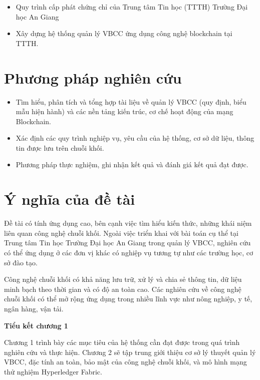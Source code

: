 \begin{itemize}
\item Quy trình cấp phát chứng chỉ của Trung tâm Tin học (TTTH) Trường Đại học An Giang
\item Xây dựng hệ thống quản lý VBCC ứng dụng công nghệ blockchain tại TTTH.
\end{itemize}

\section{Phương pháp nghiên cứu}

\begin{itemize}
\item Tìm hiểu, phân tích và tổng hợp tài liệu về quản lý VBCC (quy định, biểu mẫu hiện hành) và các nền tảng kiến trúc, cơ chế hoạt động của mạng Blockchain.
\item Xác định các quy trình nghiệp vụ, yêu cầu của hệ thống, cơ sở dữ liệu, thông tin được lưu trên chuỗi khối.
\item Phương pháp thực nghiệm, ghi nhận kết quả và đánh giá kết quả đạt được.
\end{itemize}
\section{Ý nghĩa của đề tài}

Đề tài có tính ứng dụng cao, bên cạnh việc tìm hiểu kiến thức, những khái niệm liên quan công nghệ chuỗi khối.
Ngoài việc triển khai với bài toán cụ thể tại Trung tâm Tin học Trường Đại học An Giang trong quản lý VBCC, nghiên cứu có thể ứng dụng ở các đơn vị khác có nghiệp vụ tương tự như các trường học, cơ sở đào tạo.

Công nghệ chuỗi khối có khả năng lưu trữ, xử lý và chia sẻ thông tin, dữ liệu minh bạch theo thời gian và có độ an toàn cao. Các nghiên cứu về công nghệ chuỗi khối có thể mở rộng ứng dụng trong nhiều lĩnh vực như nông nghiệp, y tế, ngân hàng, vận tải.

\textbf{Tiểu kết chương 1}

Chương 1 trình bày các mục tiêu của hệ thống cần đạt được trong quá trình nghiên cứu và thực hiện. Chương 2 sẽ tập trung giới thiệu cơ sở lý thuyết quản lý VBCC, đặc tính an toàn, bảo mật của công nghệ chuỗi khối, và mô hình mạng thử nghiệm Hyperledger Fabric.
